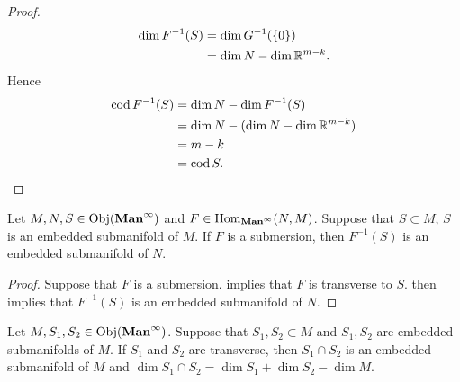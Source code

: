 \documentclass{book}
\begin{document}
\begin{proof}
		\begin{align*}
			\dim F^{-1}(S) 
			& = \dim G^{-1}(\{0\}) \\
			& = \dim N - \dim  \mathbb{R}^{m-k}.
		\end{align*}
		Hence
		\begin{align*}
			\operatorname{cod} F^{-1}(S)
			& = \dim N - \dim F^{-1}(S) \\
			& = \dim N - (\dim N - \dim \mathbb{R}^{m-k}) \\
			& = m - k \\
			& = \operatorname{cod} S.
		\end{align*}
	\end{proof}

	\begin{note}
	\end{note}

	\begin{ex} 
		Let $M, N, S \in \operatorname{Obj}(\operatorname*{\text{\textbf{Man}}^{\infty}})$ and $F \in \operatorname{Hom}_{\operatorname*{\text{\textbf{Man}}^{\infty}}}(N, M)$. Suppose that $S \subset M$, $S$ is an embedded submanifold of $M$. If $F$ is a submersion, then $F^{-1}(S)$ is an embedded submanifold of $N$.
	\end{ex}

	\begin{proof}
		Suppose that $F$ is a submersion.  implies that $F$ is transverse to $S$.  then implies that $F^{-1}(S)$ is an embedded submanifold of $N$.
	\end{proof}

	\begin{ex} 
		Let $M, S_1, S_2 \in \operatorname{Obj}(\operatorname*{\text{\textbf{Man}}^{\infty}})$. Suppose that $S_1, S_2 \subset M$ and $S_1, S_2$ are embedded submanifolds of $M$. If $S_1$ and $S_2$ are transverse, then $S_1 \cap S_2$ is an embedded submanifold of $M$ and $\dim S_1 \cap S_2 = \dim S_1 + \dim S_2 - \dim M$. 
	\end{ex}
\end{document}
